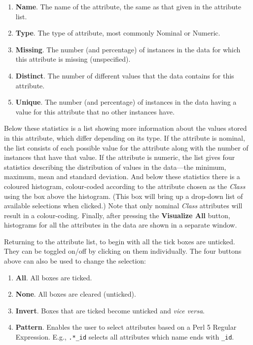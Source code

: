 \begin{enumerate}
\item \textbf{Name}.
The name of the attribute, the same as that given in the attribute list.
\item \textbf{Type}.
The type of attribute, most commonly Nominal or Numeric.
\item \textbf{Missing}.
The number (and percentage) of instances in the data for which this attribute
is missing (unspecified).
\item \textbf{Distinct}.
The number of different values that the data contains for this attribute.
\item \textbf{Unique}.
The number (and percentage) of instances in the data having a value for this
attribute that no other instances have.
\end{enumerate}
\noindent
Below these statistics is a list showing more information about the
values stored in this attribute, which differ depending on its type.
If the attribute is nominal, the list consists of each possible value
for the attribute along with the number of instances that have that
value.  If the attribute is numeric, the list gives four statistics
describing the distribution of values in the data---the minimum,
maximum, mean and standard deviation.  And below these statistics
there is a coloured histogram, colour-coded according to the attribute
chosen as the {\it Class} using the box above the histogram. (This box
will bring up a drop-down list of available selections when clicked.)
Note that only nominal {\it Class} attributes will result in a
colour-coding.  Finally, after pressing the \textbf{Visualize All}
button, histograms for all the attributes in the data are shown in a
separate window.

Returning to the attribute list, to begin with all the tick boxes are unticked.
They can be toggled on/off by clicking on them individually.  The four buttons
above can also be used to change the selection:

\begin{enumerate}
\item \textbf{All}.
All boxes are ticked.
\item \textbf{None}.
All boxes are cleared (unticked).
\item \textbf{Invert}.
Boxes that are ticked become unticked and {\em vice versa\/}.
\item \textbf{Pattern}.
Enables the user to select attributes based on a Perl 5 Regular Expression. E.g., 
\texttt{.*\_id} selects all attributes which name ends with \texttt{\_id}.
\end{enumerate}


